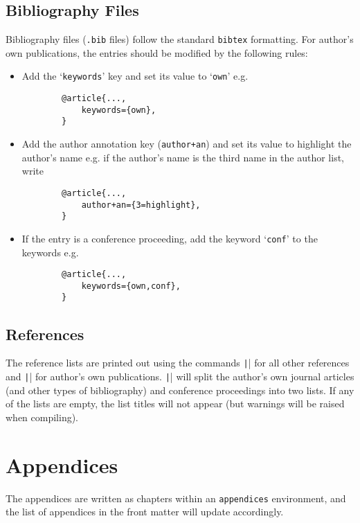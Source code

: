 \documentclass{umalayathesis}
\begin{document}
\subsection{Bibliography Files}

Bibliography files (\texttt{.bib} files) follow the standard \texttt{bibtex} formatting. For author's own publications, the entries should be modified by the following rules:

\begin{itemize}
    \item Add the `\texttt{keywords}' key and set its value to `\texttt{own}' e.g.
    \begin{verbatim}
        @article{...,
            keywords={own},
        }
    \end{verbatim}
    \item Add the author annotation key (\texttt{author+an}) and set its value to highlight the author's name e.g. if the author's name is the third name in the author list, write 
    \begin{verbatim}
        @article{...,
            author+an={3=highlight},
        }
    \end{verbatim}
    \item If the entry is a conference proceeding, add the keyword `\texttt{conf}' to the keywords e.g.
    \begin{verbatim}
        @article{...,
            keywords={own,conf},
        }
    \end{verbatim}
\end{itemize}

\subsection{References}

The reference lists are printed out using the commands \texttt|| for all other references and \texttt|\ownreferences| for author's own publications. \texttt|\ownreferences| will split the author's own journal articles (and other types of bibliography) and conference proceedings into two lists. If any of the lists are empty, the list titles will not appear (but warnings will be raised when compiling).

\section{Appendices}

The appendices are written as chapters within an \texttt{appendices} environment, and the list of appendices in the front matter will update accordingly. 
\end{document}
